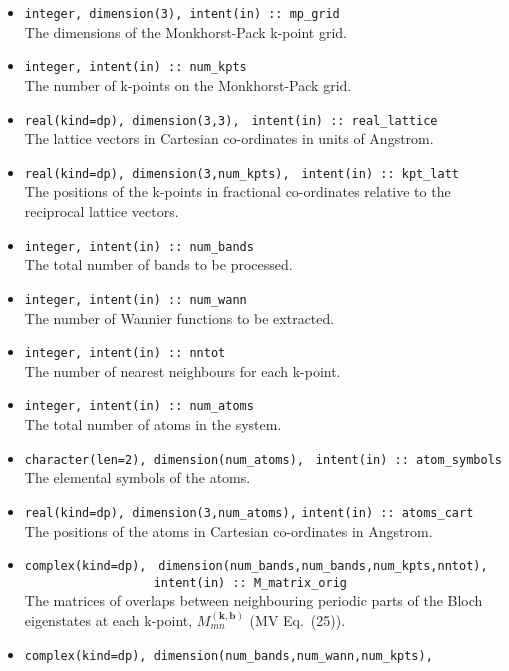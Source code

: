 \begin{itemize}
\item \verb#integer, dimension(3), intent(in) :: mp_grid#\\ The
  dimensions of the {Monkhorst-Pack} k-point grid.
\item \verb#integer, intent(in) :: num_kpts#\\ The number of k-points on
  the {Monkhorst-Pack} grid.
\item \verb#real(kind=dp), dimension(3,3),#
      \verb# intent(in) :: real_lattice#\\ The lattice vectors in
      Cartesian co-ordinates in units of Angstrom. 
\item \verb#real(kind=dp), dimension(3,num_kpts),#
      \verb# intent(in) :: kpt_latt#\\ The positions of the k-points in
      fractional co-ordinates relative to the reciprocal lattice
      vectors.
\item \verb#integer, intent(in) :: num_bands#\\ The total number of
      bands to be processed.
\item \verb#integer, intent(in) :: num_wann#\\ The number of Wannier
  functions to be extracted.
\item \verb#integer, intent(in) :: nntot#\\ The number of
  nearest neighbours for each k-point.
\item \verb#integer, intent(in) :: num_atoms#\\ The total number of atoms
  in the system.
\item \verb#character(len=2), dimension(num_atoms),#
      \verb# intent(in) :: atom_symbols#\\ The elemental symbols of
      the atoms.
\item \verb#real(kind=dp), dimension(3,num_atoms),#
      \verb#intent(in) :: atoms_cart#\\ The positions of the atoms in
      Cartesian co-ordinates in Angstrom.
\item \verb#complex(kind=dp),#
      \verb# dimension(num_bands,num_bands,num_kpts,nntot),#\\
      \verb#                  intent(in) :: M_matrix_orig#\\ 
      The matrices of overlaps between neighbouring periodic parts of
      the Bloch eigenstates at each k-point, $M_{mn}^{(\mathbf{k,b})}$
      (MV Eq.~(25)).
\item \verb#complex(kind=dp), dimension(num_bands,num_wann,num_kpts),#\\

\end{itemize}
